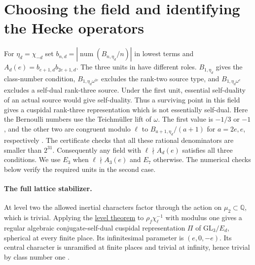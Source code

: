 \documentclass[11pt,a4paper]{article}
\newcommand{\Q}{\mathbb Q}
\newcommand{\num}{\operatorname{num}}
\begin{document}
\newpage
\section{Choosing the field and identifying the Hecke operators}
\label{sec:field-operators}
For \(\eta_d=\chi_{-d}\) set \(b_{n,d}=|\num(B_{n,\eta_d}/n)|\)
in lowest terms and \(A_d(e)=b_{e+1,d}b_{2e+1,d}\).
The three units in \cite[ES.5]{ktower} have different roles.
\(B_{1,\eta_d}\) gives the class-number condition,
\(B_{1,\eta_d\omega^{2e}}\) excludes the rank-two source type, and
\(B_{1,\eta_d\omega^e}\) excludes a self-dual rank-three source.
Under the first unit, essential self-duality of an actual source would
give self-duality. Thus a surviving point in this field gives a cuspidal
rank-three representation which is not essentially self-dual.
Here the Bernoulli numbers use the Teichmüller lift of \(\omega\).
The first value is \(-1/3\) or \(-1\), and the other two are congruent
modulo \(\ell\) to \(B_{a+1,\eta_d}/(a+1)\) for \(a=2e,e\),
respectively \cite[FV.3]{ktower}. The certificate checks that all these rational denominators are smaller than \(2^{31}\). Consequently any field with
\(\ell\nmid A_d(e)\) satisfies all three conditions. We use \(E_3\)
when \(\ell\nmid A_3(e)\) and \(E_7\) otherwise. The numerical
checks below verify the required units in the second case.

\paragraph{The full lattice stabilizer.}
At level two the allowed inertial characters factor through the
action on \(\mu_2\subset\Q\), which is trivial. Applying the \href{https://github.com/CocoSgt/riemann-hypothesis-lean/blob/7cbf7a0c32fca1badf05931879a37c3f8a2b03b4/src/Development/AutomorphicArithmetic/AutomorphicVarieties/ModularityArgument/ThresholdArguments/DenseThresholdCases/KeepLevel.lean\#L30-L36}{level theorem} to \(\rho_f\chi_\ell^{-1}\) with modulus one gives a
regular algebraic conjugate-self-dual cuspidal representation \(\Pi\)
of \(\mathrm{GL}_3/E_d\), spherical at every finite place.
Its infinitesimal parameter is \((e,0,-e)\). Its central character is
unramified at finite places and trivial at infinity, hence trivial
by class number one \cite[compact transfer]{ktower}.
\end{document}
